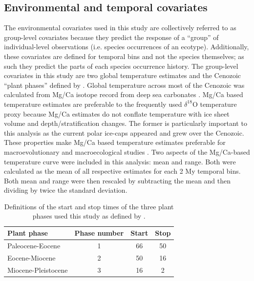 \documentclass[12pt,letterpaper]{article}
\begin{document}
\subsection*{Environmental and temporal covariates}
The environmental covariates used in this study are collectively referred to as group-level covariates because they predict the response of a ``group'' of individual-level observations (i.e. species occurrences of an ecotype). Additionally, these covariates are defined for temporal bins and not the species themselves; as such they predict the parts of each species occurrence history. The group-level covariates in this study are two global temperature estimates and the Cenozoic ``plant phases'' defined by \citet{Graham2011a}. Global temperature across most of the Cenozoic was calculated from Mg/Ca isotope record from deep sea carbonates \citep{Cramer2011}. Mg/Ca based temperature estimates are preferable to the frequently used \(\delta^{18}\)O temperature proxy \citep{Zachos2001,Zachos2008,Alroy2000g,Figueirido2012} because Mg/Ca estimates do not conflate temperature with ice sheet volume and depth/stratification changes. The former is particularly important to this analysis as the current polar ice-caps appeared and grew over the Cenozoic. These properties make Mg/Ca based temperature estimates preferable for macroevolutionary and macroecological studies \citep{Ezard2016a}. Two aspects of the Mg/Ca-based temperature curve were included in this analysis: mean and range. Both were calculated as the mean of all respective estimates for each 2 My temporal bins. Both mean and range were then rescaled by subtracting the mean and then dividing by twice the standard deviation. 

\begin{table}
  \centering
  \caption[Plant phase defintions]{Definitions of the start and stop times of the three plant phases used this study as defined by \citet{Graham2011a}.}
  \label{tab:plant_def}
  \begin{tabular}{l c c c}
    \hline
    Plant phase & Phase number & Start & Stop \\
    \hline
    Paleocene-Eocene & 1 & 66 & 50 \\
    Eocene-Miocene & 2 & 50 & 16 \\
    Miocene-Pleistocene & 3 & 16 & 2 \\
  \end{tabular}
\end{table}
\end{document}
